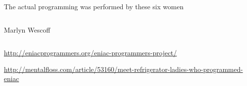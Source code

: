 \documentclass[aspectratio=169]{beamer}
\begin{document}
\begin{frame}{The actual programming was performed by these six women}
\begin{columns}[t]
\begin{center}
Marlyn Wescoff
\end{center}
\end{columns}

\small
\vspace{1 cm}
\textcolor{blue}{\url{http://eniacprogrammers.org/eniac-programmers-project/}}

\vspace{0.5 cm}
\textcolor{blue}{\url{http://mentalfloss.com/article/53160/meet-refrigerator-ladies-who-programmed-eniac}}
\end{frame}
\end{document}
